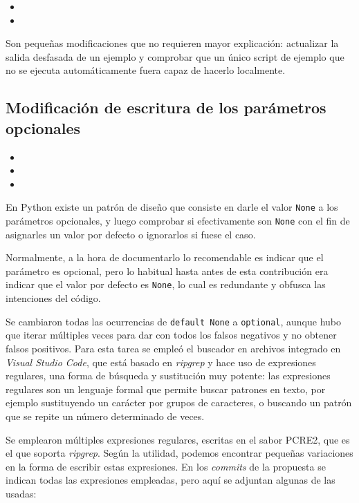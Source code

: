 \begin{itemize}
    \item {}
    \item {}
\end{itemize}

Son pequeñas modificaciones que no requieren mayor explicación: actualizar la salida desfasada de un ejemplo y comprobar que un único script de ejemplo que no se ejecuta automáticamente fuera capaz de hacerlo localmente.

\subsection{Modificación de escritura de los parámetros opcionales}

\begin{itemize}
    \item {}
    \item {}
    \item {}
\end{itemize}

En Python existe un patrón de diseño que consiste en darle el valor \texttt{None} a los parámetros opcionales, y luego comprobar si efectivamente son \texttt{None} con el fin de asignarles un valor por defecto o ignorarlos si fuese el caso.

Normalmente, a la hora de documentarlo lo recomendable es indicar que el parámetro es opcional, pero lo habitual hasta antes de esta contribución era indicar que el valor por defecto es \texttt{None}, lo cual es redundante y obfusca las intenciones del código.

Se cambiaron todas las ocurrencias de \texttt{default None} a \texttt{optional}, aunque hubo que iterar múltiples veces para dar con todos los falsos negativos y no obtener falsos positivos. Para esta tarea se empleó el buscador en archivos integrado en \textit{Visual Studio Code}, que está basado en \textit{ripgrep} y hace uso de expresiones regulares, una forma de búsqueda y sustitución muy potente: las expresiones regulares son un lenguaje formal que permite buscar patrones en texto, por ejemplo sustituyendo un carácter por grupos de caracteres, o buscando un patrón que se repite un número determinado de veces.

Se emplearon múltiples expresiones regulares, escritas en el sabor PCRE2, que es el que soporta \textit{ripgrep}. Según la utilidad, podemos encontrar pequeñas variaciones en la forma de escribir estas expresiones. En los \textit{commits} de la propuesta se indican todas las expresiones empleadas, pero aquí se adjuntan algunas de las usadas:

